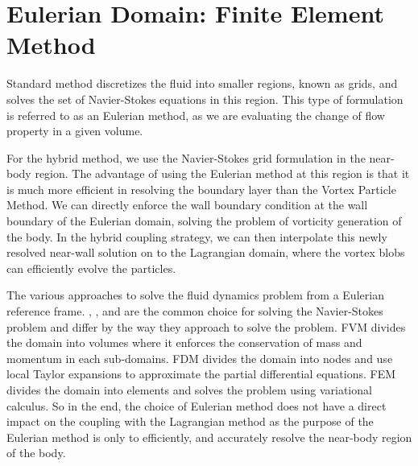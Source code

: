 \chapter{Eulerian Domain: Finite Element Method}
\label{ch:eulerian}

%	

Standard  method discretizes the fluid into smaller regions, known as grids, and solves the set of Navier-Stokes equations in this region. This type of formulation is referred to as an Eulerian method, as we are evaluating the change of flow property in a given volume.

For the hybrid method, we use the Navier-Stokes grid formulation in the near-body region. The advantage of using the Eulerian method at this region is that it is much more efficient in resolving the boundary layer than the Vortex Particle Method. We can directly enforce the wall boundary condition at the wall boundary of the Eulerian domain, solving the problem of vorticity generation of the body. In the hybrid coupling strategy, we can then interpolate this newly resolved near-wall solution on to the Lagrangian domain, where the vortex blobs can efficiently evolve the particles.

The various approaches to solve the fluid dynamics problem from a Eulerian reference frame. , , and  are the common choice for solving the Navier-Stokes problem and differ by the way they approach to solve the problem. FVM divides the domain into volumes where it enforces the conservation of mass and momentum in each sub-domains. FDM divides the domain into nodes and use local Taylor expansions to approximate the partial differential equations. FEM divides the domain into elements and solves the problem using variational calculus. So in the end, the choice of Eulerian method does not have a direct impact on the coupling with the Lagrangian method as the purpose of the Eulerian method is only to efficiently, and accurately resolve the near-body region of the body.

